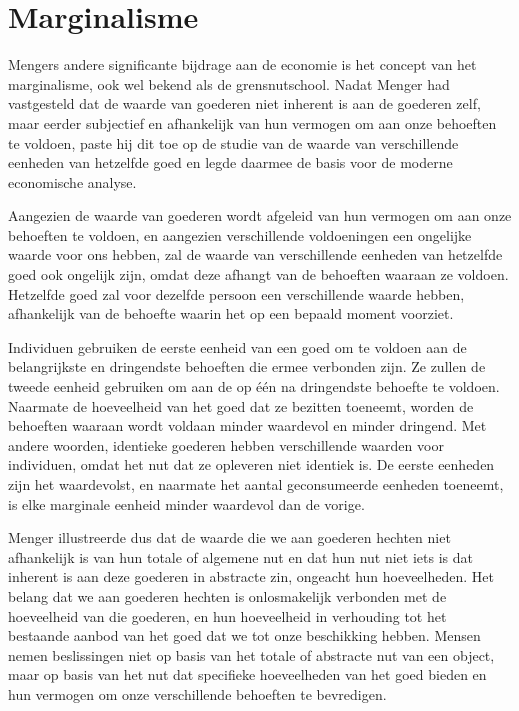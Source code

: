 \documentclass[
  a5paper,
  smalldemyvopaper,11pt,twoside,onecolumn,openright,extrafontsizes,
hidelinks]{memoir}
\begin{document}
\section{Marginalisme}\label{marginalisme}

Mengers andere significante bijdrage aan de economie is het concept van
het marginalisme, ook wel bekend als de grensnutschool. Nadat Menger had
vastgesteld dat de waarde van goederen niet inherent is aan de goederen
zelf, maar eerder subjectief en afhankelijk van hun vermogen om aan onze
behoeften te voldoen, paste hij dit toe op de studie van de waarde van
verschillende eenheden van hetzelfde goed en legde daarmee de basis voor
de moderne economische analyse.

Aangezien de waarde van goederen wordt afgeleid van hun vermogen om aan
onze behoeften te voldoen, en aangezien verschillende voldoeningen een
ongelijke waarde voor ons hebben, zal de waarde van verschillende
eenheden van hetzelfde goed ook ongelijk zijn, omdat deze afhangt van de
behoeften waaraan ze voldoen. Hetzelfde goed zal voor dezelfde persoon
een verschillende waarde hebben, afhankelijk van de behoefte waarin het
op een bepaald moment voorziet.

Individuen gebruiken de eerste eenheid van een goed om te voldoen aan de
belangrijkste en dringendste behoeften die ermee verbonden zijn. Ze
zullen de tweede eenheid gebruiken om aan de op één na dringendste
behoefte te voldoen. Naarmate de hoeveelheid van het goed dat ze
bezitten toeneemt, worden de behoeften waaraan wordt voldaan minder
waardevol en minder dringend. Met andere woorden, identieke goederen
hebben verschillende waarden voor individuen, omdat het nut dat ze
opleveren niet identiek is. De eerste eenheden zijn het waardevolst, en
naarmate het aantal geconsumeerde eenheden toeneemt, is elke marginale
eenheid minder waardevol dan de vorige.

Menger illustreerde dus dat de waarde die we aan goederen hechten niet
afhankelijk is van hun totale of algemene nut en dat hun nut niet iets
is dat inherent is aan deze goederen in abstracte zin, ongeacht hun
hoeveelheden. Het belang dat we aan goederen hechten is onlosmakelijk
verbonden met de hoeveelheid van die goederen, en hun hoeveelheid in
verhouding tot het bestaande aanbod van het goed dat we tot onze
beschikking hebben. Mensen nemen beslissingen niet op basis van het
totale of abstracte nut van een object, maar op basis van het nut dat
specifieke hoeveelheden van het goed bieden en hun vermogen om onze
verschillende behoeften te bevredigen.
\end{document}
